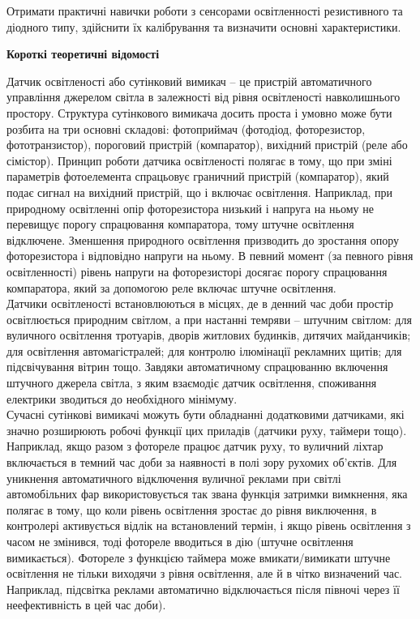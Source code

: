 \documentclass[a4paper,14pt]{extreport}
\begin{document}
Отримати практичні навички роботи з сенсорами
освітленності резистивного та діодного типу, здійснити їх калібрування та
визначити основні характеристики.


\begin{center}
\textbf{Короткі теоретичні відомості}
\end{center}

Датчик освітленості або сутінковий вимикач – це пристрій автоматичного
управління джерелом світла в залежності від рівня освітленості навколишнього
простору. Структура сутінкового вимикача досить проста і умовно може бути
розбита на три основні складові: фотоприймач (фотодіод, фоторезистор,
фототранзистор), пороговий пристрій (компаратор), вихідний пристрій (реле або
сімістор). Принцип роботи датчика освітленості полягає в тому, що при зміні
параметрів фотоелемента спрацьовує граничний пристрій (компаратор), який
подає сигнал на вихідний пристрій, що і включає освітлення. Наприклад, при
природному освітленні опір фоторезистора низький і напруга на ньому не
перевищує порогу спрацювання компаратора, тому штучне освітлення
відключене. Зменшення природного освітлення призводить до зростання опору
фоторезистора і відповідно напруги на ньому. В певний момент (за певного рівня
освітленності) рівень напруги на фоторезисторі досягає порогу спрацювання
компаратора, який за допомогою реле включає штучне освітлення.\\

Датчики освітленості встановлюються в місцях, де в денний час доби
простір освітлюється природним світлом, а при настанні темряви – штучним
світлом: для вуличного освітлення тротуарів, дворів житлових будинків, дитячих майданчиків; для освітлення автомагістралей; для контролю ілюмінації рекламних
щитів; для підсвічування вітрин тощо. Завдяки автоматичному спрацюванню
включення штучного джерела світла, з яким взаємодіє датчик освітлення,
споживання електрики зводиться до необхідного мінімуму.\\

Сучасні сутінкові вимикачі можуть бути обладнанні додатковими
датчиками, які значно розширюють робочі функції цих приладів (датчики руху,
таймери тощо). Наприклад, якщо разом з фотореле працює датчик руху, то
вуличний ліхтар включається в темний час доби за наявності в полі зору рухомих
об’єктів. Для уникнення автоматичного відключення вуличної реклами при світлі
автомобільних фар використовується так звана функція затримки вимкнення, яка
полягає в тому, що коли рівень освітлення зростає до рівня виключення, в
контролері активується відлік на встановлений термін, і якщо рівень освітлення з
часом не змінився, тоді фотореле вводиться в дію (штучне освітлення
вимикається). Фотореле з функцією таймера може вмикати/вимикати штучне
освітлення не тільки виходячи з рівня освітлення, але й в чітко визначений час.
Наприклад, підсвітка реклами автоматично відключається після півночі через її
неефективність в цей час доби).\\
\end{document}

